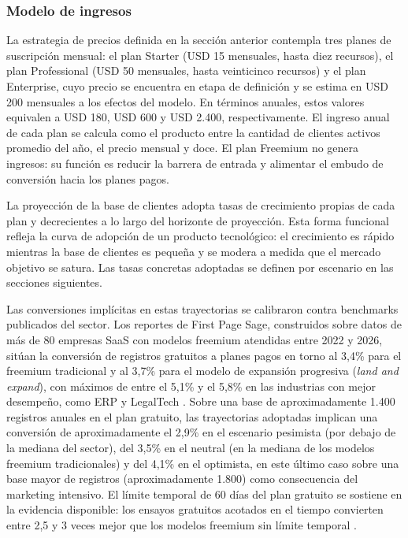\subsubsection{Modelo de ingresos}

La estrategia de precios definida en la sección anterior contempla tres planes de suscripción mensual: el plan Starter (USD 15 mensuales, hasta diez recursos), el plan Professional (USD 50 mensuales, hasta veinticinco recursos) y el plan Enterprise, cuyo precio se encuentra en etapa de definición y se estima en USD 200 mensuales a los efectos del modelo. En términos anuales, estos valores equivalen a USD 180, USD 600 y USD 2.400, respectivamente. El ingreso anual de cada plan se calcula como el producto entre la cantidad de clientes activos promedio del año, el precio mensual y doce. El plan Freemium no genera ingresos: su función es reducir la barrera de entrada y alimentar el embudo de conversión hacia los planes pagos.

La proyección de la base de clientes adopta tasas de crecimiento propias de cada plan y decrecientes a lo largo del horizonte de proyección. Esta forma funcional refleja la curva de adopción de un producto tecnológico: el crecimiento es rápido mientras la base de clientes es pequeña y se modera a medida que el mercado objetivo se satura. Las tasas concretas adoptadas se definen por escenario en las secciones siguientes.

Las conversiones implícitas en estas trayectorias se calibraron contra benchmarks publicados del sector. Los reportes de First Page Sage, construidos sobre datos de más de 80 empresas SaaS con modelos freemium atendidas entre 2022 y 2026, sitúan la conversión de registros gratuitos a planes pagos en torno al 3,4\% para el freemium tradicional y al 3,7\% para el modelo de expansión progresiva (\emph{land and expand}), con máximos de entre el 5,1\% y el 5,8\% en las industrias con mejor desempeño, como ERP y LegalTech \parencite{FirstPageSageBenchmarks2026, FirstPageSageFreemium2026}. Sobre una base de aproximadamente 1.400 registros anuales en el plan gratuito, las trayectorias adoptadas implican una conversión de aproximadamente el 2,9\% en el escenario pesimista (por debajo de la mediana del sector), del 3,5\% en el neutral (en la mediana de los modelos freemium tradicionales) y del 4,1\% en el optimista, en este último caso sobre una base mayor de registros (aproximadamente 1.800) como consecuencia del marketing intensivo. El límite temporal de 60 días del plan gratuito se sostiene en la evidencia disponible: los ensayos gratuitos acotados en el tiempo convierten entre 2,5 y 3 veces mejor que los modelos freemium sin límite temporal \parencite{FirstPageSageBenchmarks2026}.

